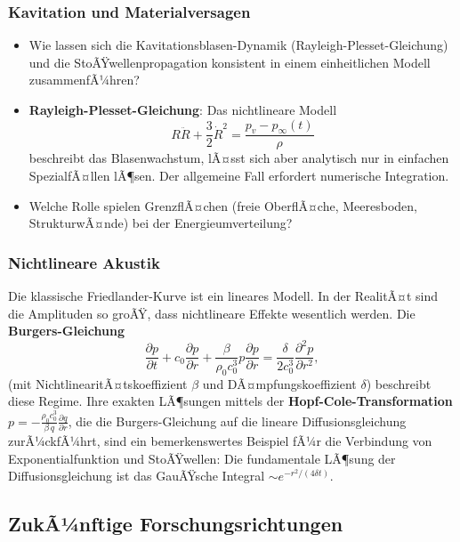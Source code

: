 ﻿\documentclass[12pt,a4paper]{article}
\theoremstyle{definition}
\theoremstyle{remark}
\begin{document}
\subsubsection{Kavitation und Materialversagen}

\begin{itemize}
\item Wie lassen sich die Kavitationsblasen-Dynamik (Rayleigh-Plesset-Gleichung) und die StoÃŸwellenpropagation konsistent in einem einheitlichen Modell zusammenfÃ¼hren?
\item \textbf{Rayleigh-Plesset-Gleichung}: Das nichtlineare Modell
\begin{equation}
R\ddot{R} + \frac{3}{2}\dot{R}^2 = \frac{p_v - p_\infty(t)}{\rho}
\end{equation}
beschreibt das Blasenwachstum, lÃ¤sst sich aber analytisch nur in einfachen SpezialfÃ¤llen lÃ¶sen. Der allgemeine Fall erfordert numerische Integration.
\item Welche Rolle spielen GrenzflÃ¤chen (freie OberflÃ¤che, Meeresboden, StrukturwÃ¤nde) bei der Energieumverteilung?
\end{itemize}

\subsubsection{Nichtlineare Akustik}

Die klassische Friedlander-Kurve ist ein lineares Modell. In der RealitÃ¤t sind die Amplituden so groÃŸ, dass nichtlineare Effekte wesentlich werden. Die \textbf{Burgers-Gleichung}
\begin{equation}
\frac{\partial p}{\partial t} + c_0 \frac{\partial p}{\partial r} + \frac{\beta}{\rho_0 c_0^3} p\frac{\partial p}{\partial r} = \frac{\delta}{2c_0^3}\frac{\partial^2 p}{\partial r^2},
\end{equation}
(mit NichtlinearitÃ¤tskoeffizient $\beta$ und DÃ¤mpfungskoeffizient $\delta$) beschreibt diese Regime. Ihre exakten LÃ¶sungen mittels der \textbf{Hopf-Cole-Transformation} $p = -\frac{\rho_0 c_0^3}{\beta\,q}\frac{\partial q}{\partial r}$, die die Burgers-Gleichung auf die lineare Diffusionsgleichung zurÃ¼ckfÃ¼hrt, sind ein bemerkenswertes Beispiel fÃ¼r die Verbindung von Exponentialfunktion und StoÃŸwellen: Die fundamentale LÃ¶sung der Diffusionsgleichung ist das GauÃŸsche Integral $\sim e^{-r^2/(4\delta t)}$.

\subsection{ZukÃ¼nftige Forschungsrichtungen}
\end{document}

